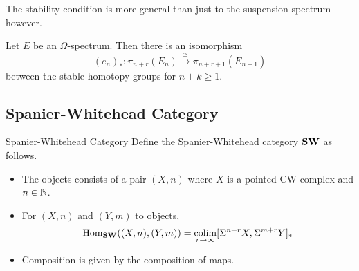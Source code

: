 \documentclass[a4paper]{article}
\begin{document}
The stability condition is more general than just to the suspension spectrum however. 

\begin{lmm}{}{} Let $E$ be an $\Omega$-spectrum. Then there is an isomorphism $$(e_n)_\ast:\pi_{n+r}(E_n)\overset{\cong}{\longrightarrow}\pi_{n+r+1}(E_{n+1})$$ between the stable homotopy groups for $n+k\geq 1$. 
\end{lmm}

\subsection{Spanier-Whitehead Category}
\begin{defn}{Spanier-Whitehead Category}{} Define the Spanier-Whitehead category $\bold{SW}$ as follows. 
\begin{itemize}
\item The objects consists of a pair $(X,n)$ where $X$ is a pointed CW complex and $n\in\mathbb{N}$. 
\item For $(X,n)$ and $(Y,m)$ to objects, $$\operatorname{Hom}_{\bold{SW}}((X,n),(Y,m))=\operatorname*{colim}_{r\to\infty}[\Sigma^{n+r}X,\Sigma^{m+r}Y]_\ast$$
\item Composition is given by the composition of maps. 
\end{itemize}
\end{defn}
\end{document}
